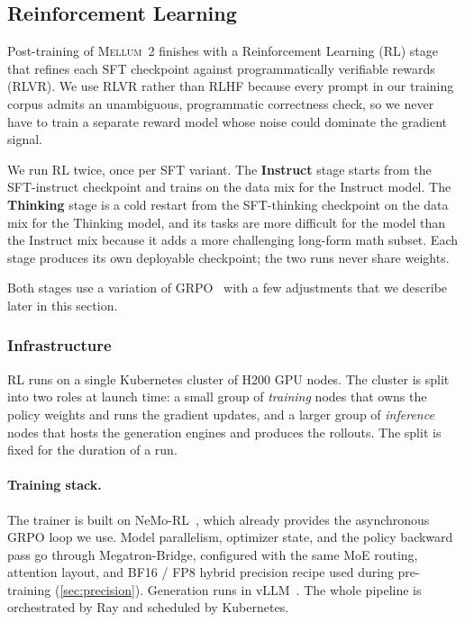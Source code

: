 \documentclass[11pt,a4paper]{article}
\newcommand{\modelname}{\textsc{Mellum~2}\xspace}
\begin{document}
\subsection{Reinforcement Learning}
\label{sec:rl}

Post-training of \modelname finishes with a Reinforcement Learning (RL) stage
that refines each SFT checkpoint against programmatically verifiable
rewards (RLVR). We use RLVR rather than RLHF because every prompt in our
training corpus admits an unambiguous, programmatic correctness check, so
we never have to train a separate reward model whose noise could
dominate the gradient signal.

We run RL twice, once per SFT variant. The \textbf{Instruct} stage starts
from the SFT-instruct checkpoint and trains on the data mix for the
Instruct model. The \textbf{Thinking} stage is a cold restart from the
SFT-thinking checkpoint on the data mix for the Thinking model, and its tasks are more difficult for the model than the Instruct mix because it adds a more challenging long-form math subset. Each stage produces its own deployable checkpoint; the two
runs never share weights.

Both stages use a variation of GRPO~\cite{shao2024deepseekmath} with a
few adjustments that we describe later in this section.

\subsubsection{Infrastructure}
\label{sec:rl-infra}

RL runs on a single Kubernetes cluster of H200 GPU nodes. The cluster is
split into two roles at launch time: a small
group of \emph{training} nodes that owns the policy weights and runs the
gradient updates, and a larger group of \emph{inference} nodes that hosts
the generation engines and produces the rollouts. The split is fixed for
the duration of a run.

\paragraph{Training stack.}
The trainer is built on NeMo-RL~\cite{nemo-rl}, which already provides
the asynchronous GRPO loop we use. Model parallelism, optimizer state, and the policy
backward pass go through Megatron-Bridge, configured with the same MoE
routing, attention layout, and BF16 / FP8 hybrid precision recipe used
during pre-training (\cref{sec:precision}). Generation runs in
vLLM~\cite{kwon2023vllm}. The whole pipeline is orchestrated by Ray and
scheduled by Kubernetes.
\end{document}
